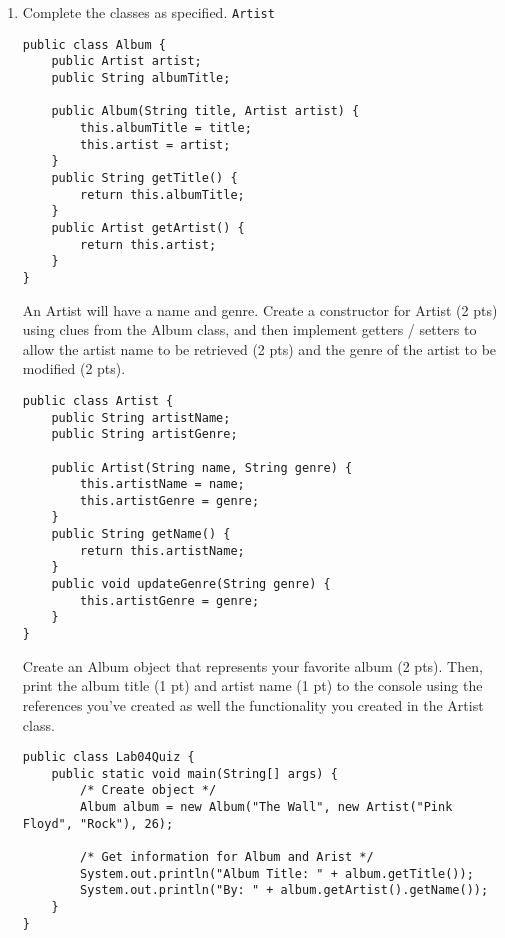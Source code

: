 \Instructions
\begin{enumerate}

\item {} Complete the classes as specified. \texttt{Artist} 

\begin{lstlisting}
public class Album {
	public Artist artist;
	public String albumTitle;

	public Album(String title, Artist artist) {
		this.albumTitle = title;
		this.artist = artist;
	}
	public String getTitle() {
		return this.albumTitle;
	}
	public Artist getArtist() {
		return this.artist;
	}
}
\end{lstlisting}
An Artist will have a name and genre. Create a constructor for Artist (2 pts) using clues from the Album class, and then implement getters / setters to allow the artist name to be retrieved (2 pts) and the genre of the artist to be modified (2 pts).
\begin{lstlisting}
public class Artist {
	public String artistName;
	public String artistGenre;

	public Artist(String name, String genre) {
		this.artistName = name;
		this.artistGenre = genre;
	}
	public String getName() {
		return this.artistName;
	}
	public void updateGenre(String genre) {
		this.artistGenre = genre;
	}
}
\end{lstlisting}
Create an Album object that represents your favorite album (2 pts). Then, print the album title (1 pt) and artist name (1 pt) to the console using the references you've created as well the functionality you created in the Artist class.
\begin{lstlisting}
public class Lab04Quiz {
	public static void main(String[] args) {
		/* Create object */
		Album album = new Album("The Wall", new Artist("Pink Floyd", "Rock"), 26);

		/* Get information for Album and Arist */
		System.out.println("Album Title: " + album.getTitle());
		System.out.println("By: " + album.getArtist().getName());
	}	
}
\end{lstlisting}
\end{enumerate}